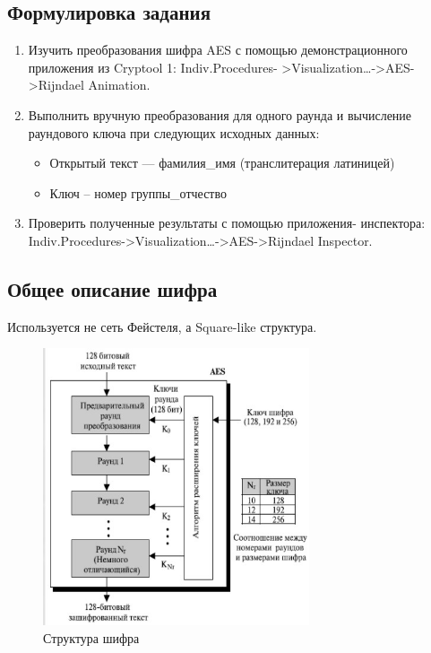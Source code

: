 \documentclass[a4paper, 14pt]{extarticle}
\begin{document}
\subsection{Формулировка задания}
\begin{enumerate}
    \item Изучить преобразования шифра AES с помощью демонстрационного приложения из Cryptool 1: Indiv.Procedures- >Visualization…->AES->Rijndael Animation.
    \item Выполнить вручную преобразования для одного раунда и вычисление раундового ключа при следующих исходных данных:
    \begin{itemize}
        \item Открытый текст --- фамилия\_имя (транслитерация латиницей)
        \item Ключ – номер группы\_отчество
    \end{itemize}
    \item Проверить полученные результаты с помощью приложения-
инспектора: Indiv.Procedures->Visualization…->AES->Rijndael Inspector.
\end{enumerate}

\subsection{Общее описание шифра}%
\label{subsec:theory_start}
Используется не сеть Фейстеля, а Square-like структура.
\begin{figure}[h]
    \centering
    \includegraphics[width=0.7\textwidth]{img/S001.jpg}
    \caption{Структура шифра}%
\end{figure}
\end{document}
